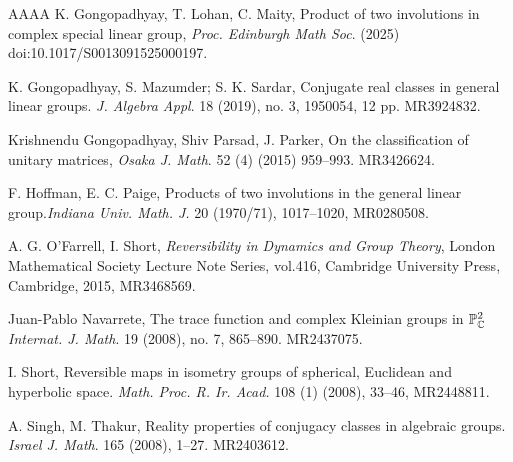 \documentclass[11pt]{amsart}
\numberwithin{equation}{section}
\theoremstyle{plain}
\theoremstyle{definition}
\numberwithin{equation}{section}
\begin{document}
\begin{thebibliography}{AAAA}
  K.  Gongopadhyay,  T.  Lohan, C.  Maity,  {Product of two involutions in complex special linear group}, {\it  Proc. Edinburgh Math Soc}. (2025) doi:10.1017/S0013091525000197.


 K. Gongopadhyay, S. Mazumder; S. K.  Sardar, 
{ Conjugate real classes in general linear groups}.
{\it J. Algebra Appl}. 18 (2019), no. 3, 1950054, 12 pp. MR3924832.

Krishnendu Gongopadhyay, Shiv Parsad, J. Parker, On the classification of unitary matrices, {\it Osaka J. Math}. 52 (4) (2015) 959–993. MR3426624.

	
 F. Hoffman, E. C.  Paige,  Products of two involutions in the general linear group.\textit{Indiana Univ. Math. J.} 20 (1970/71), 1017--1020, MR0280508.
	
	
 A.  G. O’Farrell,   I.  Short, {\it Reversibility in Dynamics and Group Theory}, London Mathematical Society Lecture Note Series, vol.416, Cambridge University Press, Cambridge, 2015, MR3468569.

Juan-Pablo Navarrete, 
The trace function and complex Kleinian groups in {$\Bbb P^2_{\Bbb C}$}
{\it Internat. J. Math}. 19 (2008), no. 7, 865–890. MR2437075.


  I. Short, Reversible maps in isometry groups of spherical, Euclidean and hyperbolic space. {\it Math. Proc. R. Ir. Acad.} 108 (1) (2008), 33--46, MR2448811.

 A. Singh, M. Thakur, Reality properties of conjugacy classes in algebraic groups.
{\it Israel J. Math}. 165 (2008), 1–27. MR2403612.

\end{thebibliography}
\end{document}
